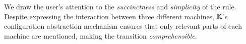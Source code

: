We draw the user's attention to the \textit{succinctness} and \textit{simplicity}
of the rule. Despite expressing the interaction between three different machines,
$\mathbb{K}$'s configuration abstraction mechanism ensures that only relevant parts of
each machine are mentioned, making the transition \textit{comprehensible}.
